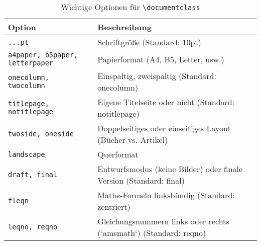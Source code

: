\begin{table}[h]
    \centering
    \begin{tabular}{ll}
        \toprule
        \textbf{Option}                        & \textbf{Beschreibung}                                              \\
        \midrule
        \texttt{...pt}                         & Schriftgröße (Standard: 10pt)                                      \\
        \texttt{a4paper, b5paper, letterpaper} & Papierformat (A4, B5, Letter, usw.)                                \\
        \texttt{onecolumn, twocolumn}          & Einspaltig, zweispaltig (Standard: onecolumn)                      \\
        \texttt{titlepage, notitlepage}        & Eigene Titelseite oder nicht    (Standard: notitlepage)            \\
        \texttt{twoside, oneside}              & Doppelseitiges oder einseitiges Layout (Bücher vs. Artikel)        \\
        \texttt{landscape}                     & Querformat                                                         \\
        \texttt{draft, final}                  & Entwurfsmodus (keine Bilder) oder finale Version (Standard: final) \\
        \texttt{fleqn}                         & Mathe-Formeln linksbündig (Standard: zentriert)                    \\
        \texttt{leqno, reqno}                  & Gleichungsnummern links oder rechts (`amsmath`) (Standard: reqno)  \\
        \bottomrule
    \end{tabular}
    \caption{Wichtige Optionen für \texttt{\textbackslash documentclass}}
    \label{tab:documentclass-options}
\end{table}